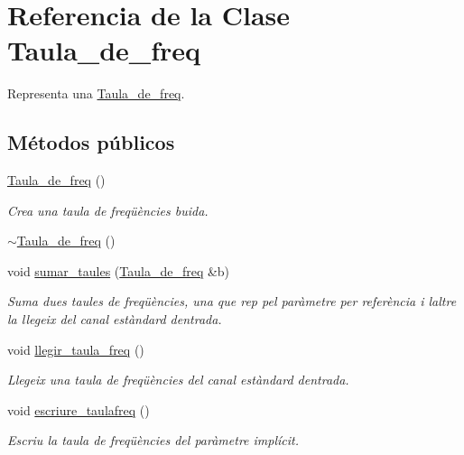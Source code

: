 \hypertarget{class_taula__de__freq}{}\section{Referencia de la Clase Taula\+\_\+de\+\_\+freq}
\label{class_taula__de__freq}


Representa una \hyperlink{class_taula__de__freq}{Taula\+\_\+de\+\_\+freq}.  


\subsection*{Métodos públicos}
\begin{DoxyCompactItemize}
\item 
\hyperlink{class_taula__de__freq_a57b8d780af285f09746da0a96dfd9d61}{Taula\+\_\+de\+\_\+freq} ()
\begin{DoxyCompactList}\small\item\em Crea una taula de freqüències buida. \end{DoxyCompactList}\item 
\hyperlink{class_taula__de__freq_a046a70a0ea38d03da605998cf99d5335}{$\sim$\+Taula\+\_\+de\+\_\+freq} ()
\item 
void \hyperlink{class_taula__de__freq_a59add68c3c129a8908907b038d6344f8}{sumar\+\_\+taules} (\hyperlink{class_taula__de__freq}{Taula\+\_\+de\+\_\+freq} \&b)
\begin{DoxyCompactList}\small\item\em Suma dues taules de freqüències, una que rep pel paràmetre per referència i l\textquotesingle{}altre la llegeix del canal estàndard d\textquotesingle{}entrada. \end{DoxyCompactList}\item 
void \hyperlink{class_taula__de__freq_a6e3d7bfaa7227f9b7603864c7a3da2cf}{llegir\+\_\+taula\+\_\+freq} ()
\begin{DoxyCompactList}\small\item\em Llegeix una taula de freqüències del canal estàndard d\textquotesingle{}entrada. \end{DoxyCompactList}\item 
void \hyperlink{class_taula__de__freq_a2b05df9845a043e67775f923bdfd60a0}{escriure\+\_\+taulafreq} ()
\begin{DoxyCompactList}\small\item\em Escriu la taula de freqüències del paràmetre implícit. \end{DoxyCompactList}\end{DoxyCompactItemize}


